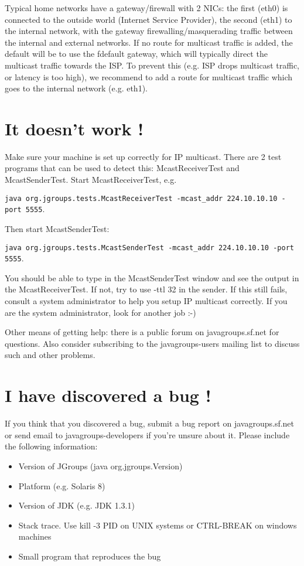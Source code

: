   Typical home networks have a gateway/firewall with 2 NICs: the first (eth0) is
  connected to the outside world (Internet Service Provider), the second (eth1) to
  the internal network, with the gateway firewalling/masquerading traffic between the
  internal and external networks. If no route for multicast traffic is added, the
  default will be to use the fdefault gateway, which will typically direct the
  multicast traffic towards the ISP. To prevent this (e.g. ISP drops multicast
  traffic, or latency is too high), we recommend to add a route for multicast traffic
  which goes to the internal network (e.g. eth1).


  \section{It doesn't work !} \label{ItDoesntWork}

  Make sure your machine is set up correctly for IP multicast. There are 2 test
  programs that can be used to detect this: McastReceiverTest and
  McastSenderTest. Start McastReceiverTest, e.g.

  {\tt java org.jgroups.tests.McastReceiverTest -mcast\_addr 224.10.10.10 -port 5555}.

  Then start McastSenderTest: 

  {\tt java org.jgroups.tests.McastSenderTest -mcast\_addr 224.10.10.10 -port 5555}.

  You should be able to type in the McastSenderTest window and see the output in the
  McastReceiverTest. If not, try to use -ttl 32 in the sender. If this still fails,
  consult a system administrator to help you setup IP multicast correctly. If you are
  the system administrator, look for another job :-)

  Other means of getting help: there is a public forum on javagroups.sf.net for
  questions. Also consider subscribing to the javagroups-users mailing list to
  discuss such and other problems.


  \section{I have discovered a bug !}

  If you think that you discovered a bug, submit a bug report on javagroups.sf.net or
  send email to javagroups-developers if you're unsure about it. Please include the
  following information:

  \begin{itemize}
  \item Version of JGroups (java org.jgroups.Version) 
  \item Platform (e.g. Solaris 8) 
  \item Version of JDK (e.g. JDK 1.3.1) 
  \item Stack trace. Use kill -3 PID on UNIX systems or CTRL-BREAK on windows machines 
  \item Small program that reproduces the bug 
  \end{itemize}


  